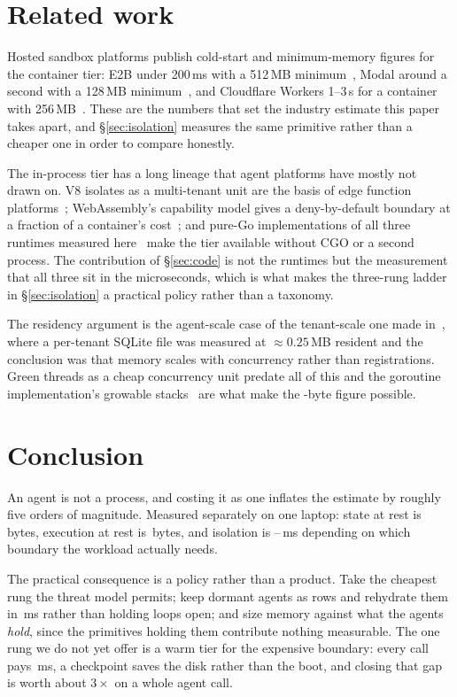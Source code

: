 \section{Related work}
\label{sec:related}

Hosted sandbox platforms publish cold-start and minimum-memory figures for the
container tier: E2B under 200\,ms with a 512\,MB minimum~\cite{e2b}, Modal
around a second with a 128\,MB minimum~\cite{modal}, and Cloudflare Workers
1--3\,s for a container with 256\,MB~\cite{cfworkers}. These are the numbers that
set the industry estimate this paper takes apart, and \S\ref{sec:isolation}
measures the same primitive rather than a cheaper one in order to compare
honestly.

The in-process tier has a long lineage that agent platforms have mostly not
drawn on. V8 isolates as a multi-tenant unit are the basis of edge function
platforms~\cite{cfworkers}; WebAssembly's capability model gives a deny-by-default
boundary at a fraction of a container's cost~\cite{wasm}; and pure-Go
implementations of all three runtimes measured here~\cite{wazero,goja,gpython}
make the tier available without CGO or a second process. The contribution of
\S\ref{sec:code} is not the runtimes but the measurement that all three sit in
the microseconds, which is what makes the three-rung ladder in
\S\ref{sec:isolation} a practical policy rather than a taxonomy.

The residency argument is the agent-scale case of the tenant-scale one made
in~\cite{unifiedtenant}, where a per-tenant SQLite file was measured at
${\approx}0.25$\,MB resident and the conclusion was that memory scales with
concurrency rather than registrations. Green threads as a cheap concurrency unit
predate all of this and the goroutine implementation's growable
stacks~\cite{gostack} are what make the \rGoPer{}-byte figure possible.

\section{Conclusion}
\label{sec:conclusion}

An agent is not a process, and costing it as one inflates the estimate by
roughly five orders of magnitude. Measured separately on one laptop: state at
rest is \rFleetPer{}\,bytes, execution at rest is \rGoPer{}\,bytes, and isolation
is \rVeight{}--\rVm{}\,ms depending on which boundary the workload actually
needs.

The practical consequence is a policy rather than a product. Take the cheapest
rung the threat model permits; keep dormant agents as rows and rehydrate them in
\rFleetResume{}\,ms rather than holding loops open; and size memory against what
the agents \emph{hold}, since the primitives holding them contribute nothing
measurable. The one rung we do not yet offer is a warm tier for the expensive
boundary: every call pays \rVm{}\,ms, a checkpoint saves the disk rather than the
boot, and closing that gap is worth about $3\times$ on a whole agent call.

